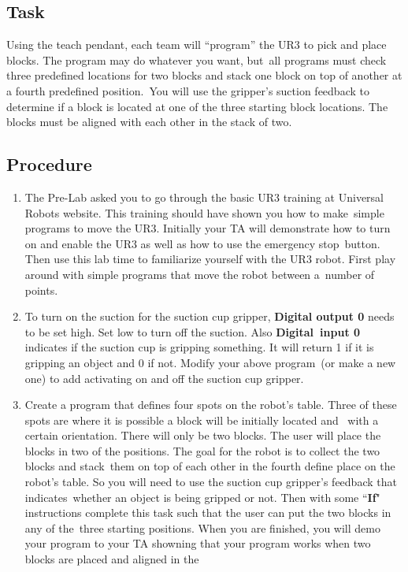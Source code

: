 \subsection{Task}
Using the teach pendant, each team will ``program'' the UR3 to pick and place blocks.  The program may do whatever you want, but\ 
all programs must check three predefined locations for two blocks and stack one block on top of another at a fourth predefined position.\ 
You will use the gripper's suction feedback to determine if a block is located at one of the three starting block locations.  The blocks must
be aligned with each other in the stack of two.  

\subsection{Procedure}
\begin{enumerate}
\item The Pre-Lab asked you to go through the basic UR3 training at Universal Robots website.  This training should have shown you how to make\ 
simple programs to move the UR3.  Initially your TA will demonstrate how to turn on and enable the UR3 as well as how to use the emergency stop\ 
button.  Then use this lab time to familiarize yourself with the UR3 robot.  First play around with simple programs that move the robot between a\ 
number of points.  
\item To turn on the suction for the suction cup gripper, \textbf{Digital output 0} needs to be set high.  Set low to turn off the suction.  Also \textbf{Digital\ 
input 0} indicates if the suction cup is gripping something.  It will return 1 if it is gripping an object and 0 if not.  Modify your above program\ 
(or make a new one) to add activating on and off the suction cup gripper.  
\item Create a program that defines four spots on the robot's table.  Three of these spots are where it is possible a block will be initially located and \
with a certain orientation.
There will only be two blocks.  The user will place the blocks in two of the positions.  The goal for the robot is to collect the two blocks and stack\
them on top of each other in the fourth define place on the robot's table.  So you will need to use the suction cup gripper's feedback that indicates\ 
whether an object is being gripped or not.  Then with some ``\textbf{If}" instructions complete this task such that the user can put the two blocks in any of the\
three starting positions.  When you are finished, you will demo your program to your TA showning that your program works when two blocks are placed and aligned in the\

\end{enumerate}
